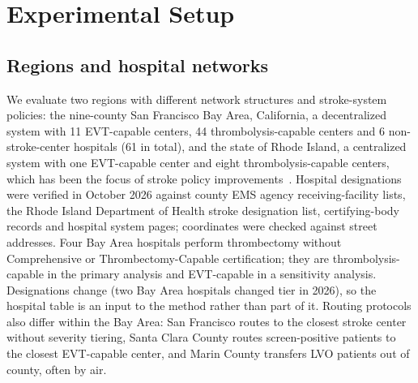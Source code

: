 \section{Experimental Setup}
\label{sec:setup}

\subsection{Regions and hospital networks}
We evaluate two regions with different network structures and stroke-system policies: the nine-county San Francisco Bay Area, California, a decentralized system with 11 EVT-capable centers, 44 thrombolysis-capable centers and 6 non-stroke-center hospitals (61 in total), and the state of Rhode Island, a centralized system with one EVT-capable center and eight thrombolysis-capable centers, which has been the focus of stroke policy improvements~\cite{jayaraman2023}. Hospital designations were verified in October 2026 against county EMS agency receiving-facility lists, the Rhode Island Department of Health stroke designation list, certifying-body records and hospital system pages; coordinates were checked against street addresses. Four Bay Area hospitals perform thrombectomy without Comprehensive or Thrombectomy-Capable certification; they are thrombolysis-capable in the primary analysis and EVT-capable in a sensitivity analysis. Designations change (two Bay Area hospitals changed tier in 2026), so the hospital table is an input to the method rather than part of it. Routing protocols also differ within the Bay Area: San Francisco routes to the closest stroke center without severity tiering, Santa Clara County routes screen-positive patients to the closest EVT-capable center, and Marin County transfers LVO patients out of county, often by air.

